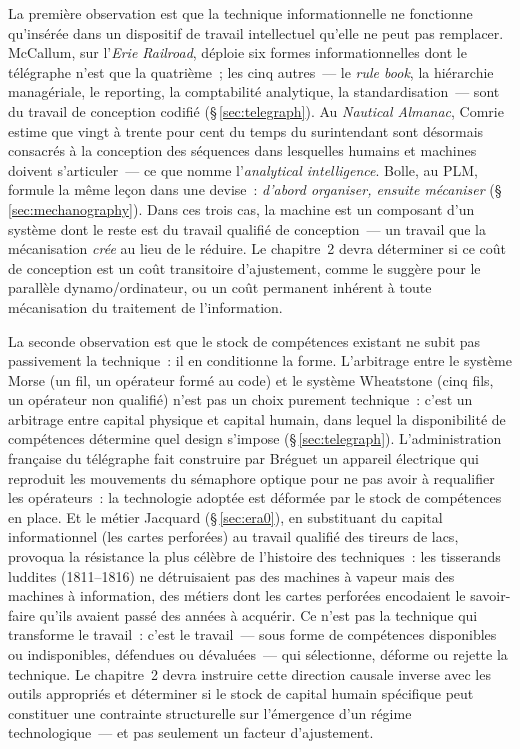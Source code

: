 La première observation est que la technique informationnelle ne fonctionne qu'insérée dans un dispositif de travail intellectuel qu'elle ne peut pas remplacer. McCallum, sur l'\emph{Erie Railroad}, déploie six formes informationnelles dont le télégraphe n'est que la quatrième~; les cinq autres~--- le \emph{rule book}, la hiérarchie managériale, le reporting, la comptabilité analytique, la standardisation~--- sont du travail de conception codifié (§\,\ref{sec:telegraph}). Au \emph{Nautical Almanac}, Comrie estime que vingt à trente pour cent du temps du surintendant sont désormais consacrés à la conception des séquences dans lesquelles humains et machines doivent s'articuler~--- ce que \textcite{daston_calculation_2018} nomme l'\emph{analytical intelligence}. Bolle, au PLM, formule la même leçon dans une devise~: \og \emph{d'abord organiser, ensuite mécaniser}\fg{} (§\,\ref{sec:mechanography}). Dans ces trois cas, la machine est un composant d'un système dont le reste est du travail qualifié de conception~--- un travail que la mécanisation \emph{crée} au lieu de le réduire. Le chapitre~2 devra déterminer si ce coût de conception est un coût transitoire d'ajustement, comme le suggère \textcite{david_dynamo_1990} pour le parallèle dynamo/ordinateur, ou un coût permanent inhérent à toute mécanisation du traitement de l'information.

La seconde observation est que le stock de compétences existant ne subit pas passivement la technique~: il en conditionne la forme. L'arbitrage entre le système Morse (un fil, un opérateur formé au code) et le système Wheatstone (cinq fils, un opérateur non qualifié) n'est pas un choix purement technique~: c'est un arbitrage entre capital physique et capital humain, dans lequel la disponibilité de compétences détermine quel design s'impose (§\,\ref{sec:telegraph}). L'administration française du télégraphe fait construire par Bréguet un appareil électrique qui reproduit les mouvements du sémaphore optique pour ne pas avoir à requalifier les opérateurs~: la technologie adoptée est déformée par le stock de compétences en place. Et le métier Jacquard (§\,\ref{sec:era0}), en substituant du capital informationnel (les cartes perforées) au travail qualifié des tireurs de lacs, provoqua la résistance la plus célèbre de l'histoire des techniques~: les tisserands luddites (1811--1816) ne détruisaient pas des machines à vapeur mais des machines à information, des métiers dont les cartes perforées encodaient le savoir-faire qu'ils avaient passé des années à acquérir. Ce n'est pas la technique qui transforme le travail~: c'est le travail~--- sous forme de compétences disponibles ou indisponibles, défendues ou dévaluées~--- qui sélectionne, déforme ou rejette la technique. Le chapitre~2 devra instruire cette direction causale inverse avec les outils appropriés et déterminer si le stock de capital humain spécifique peut constituer une contrainte structurelle sur l'émergence d'un régime technologique~--- et pas seulement un facteur d'ajustement.

